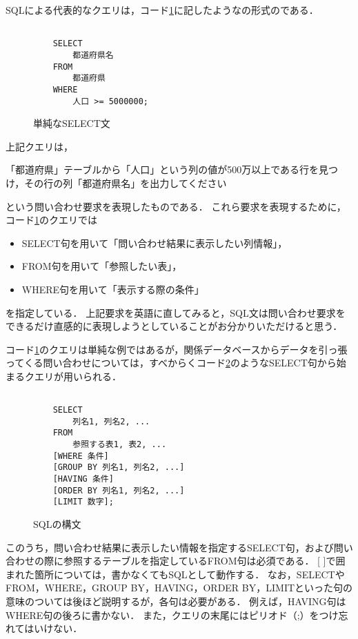 SQLによる代表的なクエリは，コード\ref{code:first-sql}に記したようなの形式のである．
\begin{figure}[tb]
    \begin{verbatim}

    SELECT
        都道府県名
    FROM
        都道府県
    WHERE
        人口 >= 5000000;
    \end{verbatim}
    \captionsetup{name=コード}
    \caption{単純なSELECT文}
    \label{code:first-sql}
\end{figure}
上記クエリは，
\begin{framed}
「都道府県」テーブルから「人口」という列の値が500万以上である行を見つけ，その行の列「都道府県名」を出力してください
\end{framed}
という問い合わせ要求を表現したものである．
これら要求を表現するために，コード\ref{code:first-sql}のクエリでは
\begin{itemize}
\item \textsc{SELECT}句を用いて「問い合わせ結果に表示したい列情報」，
\item \textsc{FROM}句を用いて「参照したい表」，
\item \textsc{WHERE}句を用いて「表示する際の条件」
\end{itemize}
を指定している．
上記要求を英語に直してみると，SQL文は問い合わせ要求をできるだけ直感的に表現しようとしていることがお分かりいただけると思う．

コード\ref{code:first-sql}のクエリは単純な例ではあるが，関係データベースからデータを引っ張ってくる問い合わせについては，すべからくコード\ref{code:sql-structure}のような\textsc{SELECT}句から始まるクエリが用いられる．
\begin{figure}[tb]
    \begin{verbatim}

    SELECT
        列名1, 列名2, ...
    FROM
        参照する表1, 表2, ...
    [WHERE 条件]
    [GROUP BY 列名1, 列名2, ...]
    [HAVING 条件]
    [ORDER BY 列名1, 列名2, ...]
    [LIMIT 数字];
    \end{verbatim}
    \captionsetup{name=コード}
    \caption{SQLの構文}
    \label{code:sql-structure}
\end{figure}
このうち，問い合わせ結果に表示したい情報を指定するSELECT句，および問い合わせの際に参照するテーブルを指定しているFROM句は必須である．
[ ]で囲まれた箇所については，書かなくてもSQLとして動作する．
なお，SELECTやFROM，WHERE，GROUP BY，HAVING，ORDER BY，LIMITといった句の意味のついては後ほど説明するが，各句は必要がある．
例えば，HAVING句はWHERE句の後ろに書かない．
また，クエリの末尾にはピリオド（;）をつけ忘れてはいけない．

